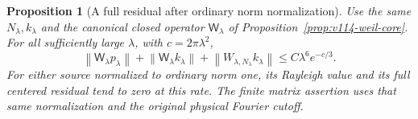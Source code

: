 \documentclass[11pt]{article}
\newtheorem{proposition}[theorem]{Proposition}
\theoremstyle{remark}
\newcommand{\norm}[1]{\left\lVert #1\right\rVert}
\begin{document}
\begin{proposition}[A full residual after ordinary norm normalization]
\label{prop:v115-absolute-residual}
Use the same $N_\lambda,k_\lambda$ and the canonical closed operator
$\mathsf W_\lambda$ of Proposition~\ref{prop:v114-weil-core}.
For all sufficiently large $\lambda$, with $c=2\pi\lambda^2$,
\begin{equation}\label{eq:v115-absolute-residual}
 \norm{\mathsf W_\lambda p_\lambda}
 +\norm{\mathsf W_\lambda k_\lambda}
 +\norm{W_{\lambda,N_\lambda}k_\lambda}
       \le C\lambda^6 e^{-c/3}.
\end{equation}
For either source normalized to ordinary norm one, its Rayleigh value
and its full centered residual tend to zero at this rate. The finite
matrix assertion uses that same normalization and the original physical
Fourier cutoff.
\end{proposition}
\end{document}
